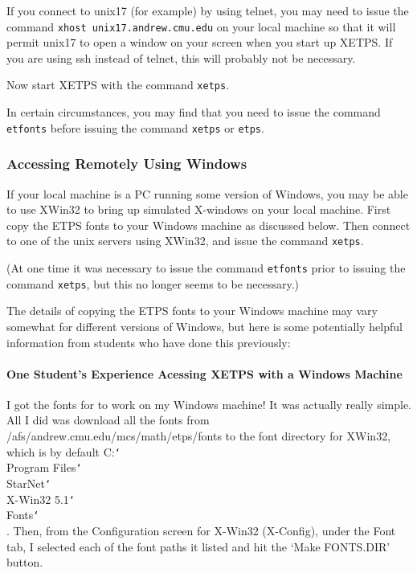 \documentclass{article}
\begin{document}

If you connect to unix17 (for example) by using telnet,
you may need to issue the command\newline{}
{\tt xhost unix17.andrew.cmu.edu}\newline{}
on your local machine  so that  it will permit unix17 to open a window on your screen
when you start up XETPS. If you are using ssh instead of
telnet, this will probably not be necessary.

Now start XETPS with the command \newline{}
{\tt xetps}.

In certain circumstances, you may find that you need to 
issue the command {\tt etfonts} before  issuing the command 
{\tt xetps} or {\tt etps}.

\subsubsection{Accessing {\ETPS} Remotely Using Windows}


If your local machine is a PC running some version of Windows, you may
be able to use XWin32 to bring up simulated X-windows on your local machine.
First copy the ETPS fonts to your Windows machine as discussed below.
Then connect to one of the unix servers using XWin32, and issue the
command \newline{}
{\tt xetps}.

(At one time it was necessary to issue the command {\tt etfonts} prior to
issuing the command {\tt xetps}, but this no longer seems to be necessary.)

The details of copying the ETPS fonts to your Windows machine may vary
somewhat for different versions of Windows, but here is some
potentially helpful information from students who have done this
previously:

\paragraph{One Student's Experience Acessing XETPS with a Windows Machine}

I got the fonts for {\ETPS} to work on my Windows machine! It was actually
really simple. All I did was download all the fonts from
/afs/andrew.cmu.edu/mcs/math/etps/fonts to the font directory for XWin32,
which is by default C:{\tt\char`\\}Program Files{\tt\char`\\}StarNet{\tt\char`\\}X-Win32 5.1{\tt\char`\\}Fonts{\tt\char`\\}.
Then, from the Configuration screen for X-Win32 (X-Config), under the Font
tab, I selected each of the font paths it listed and hit the `Make
FONTS.DIR' button.
\end{document}
